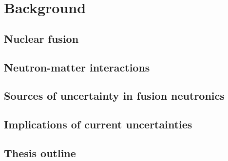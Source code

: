 
\chapter{Background} %

\ifpdf
    \graphicspath{{Chapter0/Figs/Raster/}{Chapter0/Figs/PDF/}{Chapter0/Figs/}}
\else
    \graphicspath{{Chapter0/Figs/Vector/}{Chapter0/Figs/}}
\fi

\section{Nuclear fusion}

\section{Neutron-matter interactions}

\section{Sources of uncertainty in fusion neutronics}

\section{Implications of current uncertainties}

\section{Thesis outline}
